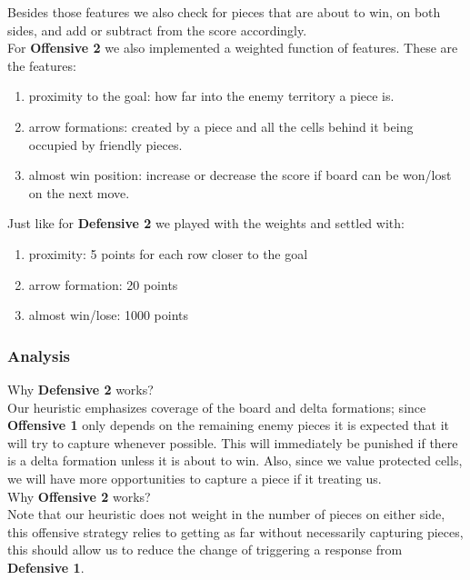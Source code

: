 \documentclass[11pt]{article}
\begin{document}
Besides those features we also check for pieces that are about to win, on both sides, and add or subtract from the score accordingly.\\

For \textbf{Offensive 2} we also implemented a weighted function of features. These are the features:
\begin{enumerate}
\item proximity to the goal: how far into the enemy territory a piece is.
\item arrow formations: created by a piece and all the cells behind it being occupied by friendly pieces.
\item almost win position: increase or decrease the score if board can be won/lost on the next move.
\end{enumerate}

Just like for \textbf{Defensive 2} we played with the weights and settled with:
\begin{enumerate}
\item proximity: 5 points for each row closer to the goal
\item arrow formation: 20 points
\item almost win/lose: 1000 points
\end{enumerate}

\subsubsection*{Analysis}
Why \textbf{Defensive 2} works?\\
Our heuristic emphasizes coverage of the board and delta formations; since \textbf{Offensive 1} only depends on the remaining enemy pieces it is expected that it will try to capture whenever possible. This will immediately be punished if there is a delta formation unless it is about to win. Also, since we value protected cells, we will have more opportunities to capture a piece if it treating us.\\

Why \textbf{Offensive 2} works?\\
Note that our heuristic does not weight in the number of pieces on either side, this offensive strategy relies to getting as far without necessarily capturing pieces, this should allow us to reduce the change of triggering a response from \textbf{Defensive 1}.\\
\end{document}
